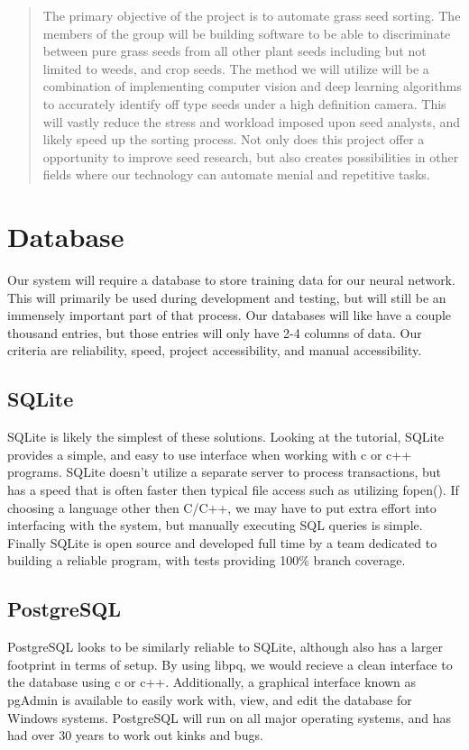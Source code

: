 \documentclass[onecolumn, draftclsnofoot,10pt, compsoc]{IEEEtran}
\begin{document}
\begin{titlepage}
\begin{singlespace}
\begin{abstract}
        	The primary objective of the project is to automate grass seed sorting. The members of the group will be building software to be able to discriminate between pure grass seeds from all other plant seeds including but not limited to weeds, and crop seeds. The method we will utilize will be a combination of implementing computer vision and deep learning algorithms to accurately identify off type seeds under a high definition camera. This will vastly reduce the stress and workload imposed upon seed analysts, and likely speed up the sorting process. Not only does this project offer a opportunity to improve seed research, but also creates possibilities in other fields where our technology can automate menial and repetitive tasks.
        \end{abstract}     
    \end{singlespace}
\end{titlepage}
\newpage
{}
\tableofcontents
\clearpage

\section{Database}
Our system will require a database to store training data for our neural network. This will primarily  be used during development and testing, but will still be an immensely important part of that process. Our databases will like have a couple thousand entries, but those entries will only have 2-4 columns of data. Our criteria are reliability, speed, project accessibility, and manual accessibility. 
\subsection{SQLite}
SQLite is likely the simplest of these solutions. Looking at the tutorial, SQLite provides a simple, and easy to use interface when working with c or c++ programs.\cite{sqlite} SQLite doesn't utilize a separate server to process transactions, but has a speed that is often faster then typical file access such as utilizing fopen().\cite{sqlite} If choosing a language other then C/C++, we may have to put extra effort into interfacing with the system, but manually executing SQL queries is simple. Finally SQLite is open source and developed full time by a team dedicated to building a reliable program, with tests providing 100\% branch coverage.\cite{sqlite}
\subsection{PostgreSQL}
PostgreSQL looks to be similarly reliable to SQLite, although also has a larger footprint in terms of setup. By using libpq, we would recieve a clean interface to the database using c or c++. \cite{libpq} Additionally, a graphical interface known as pgAdmin is available to easily work with, view, and edit the database for Windows systems. \cite{pgadmin} PostgreSQL will run on all major operating systems, and has had over 30 years to work out kinks and bugs. \cite{postgres}
\end{document}
